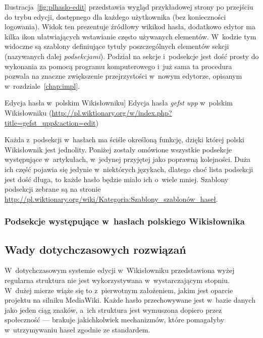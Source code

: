 Ilustracja~\ref{fig:plhaslo-edit} przedstawia wygląd przykładowej strony po przejściu do trybu edycji, dostępnego dla każdego użytkownika (bez konieczności logowania). Widok ten prezentuje źródłowy wikikod hasła, dodatkowo edytor ma kilka ikon ułatwiających wstawianie często używanych elementów. W~kodzie tym widoczne są szablony definiujące tytuły poszczególnych elementów sekcji (nazywanych dalej \emph{podsekcjami}). Podział na sekcje i~podsekcje jest dość prosty do wykonania za pomocą programu komputerowego i~już sama ta procedura pozwala na znaczne zwiększenie przejrzystości w~nowym edytorze, opisanym w~rozdziale~\ref{chap:impl}.

\begin{illustration}
	\caption
		[Edycja hasła w~polskim Wikisłowniku]
		{Edycja hasła \emph{gefst upp} w~polskim Wikisłowniku (\protect\url{http://pl.wiktionary.org/w/index.php?title=gefst_upp&action=edit})}
	\label{fig:plhaslo-edit}
\end{illustration}

Każda z~podsekcji w~hasłach ma ściśle określoną funkcję, dzięki której polski Wikisłownik jest jednolity. Poniżej zostały omówione wszystkie podsekcje występujące w~artykułach, w~jedynej przyjętej jako poprawną kolejności. Duża ich część pojawia się jedynie w~niektórych językach, dlatego choć lista podsekcji jest dość długa, to każde hasło będzie miało ich o~wiele mniej. Szablony podsekcji zebrane są na stronie \url{http://pl.wiktionary.org/wiki/Kategoria:Szablony_szablonów_haseł}.

\subsubsection{Podsekcje występujące w~hasłach polskiego Wikisłownika}
\label{wikt:subsections}



\subsection{Wady dotychczasowych rozwiązań}
\label{wikt:drawbacks}
W~dotychczasowym systemie edycji w~Wikisłowniku przedstawiona wyżej regularna struktura nie jest wykorzystywana w~wystarczającym stopniu. W~dużej mierze wiąże się to z~pierwotnym założeniem, jakim jest oparcie projektu na silniku MediaWiki. Każde hasło przechowywane jest w~bazie danych jako jeden ciąg znaków, a~ich struktura jest wymuszona dopiero przez społeczność --- brakuje jakichkolwiek mechanizmów, które pomagałyby w~utrzymywaniu haseł zgodnie ze standardem.

